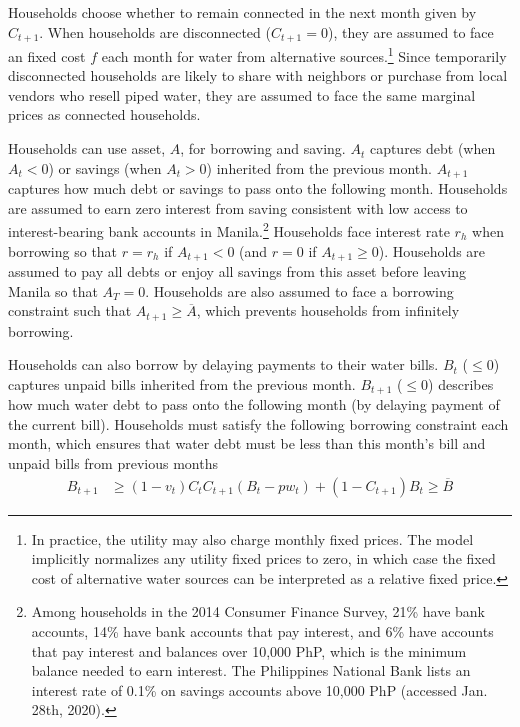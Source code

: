 \documentclass[12pt,table]{article}
\begin{document}
Households choose whether to remain connected in the next month given by $C_{t+1}$.  When households are disconnected ($C_{t+1}=0$), they are assumed to face an fixed cost $f$ each month for water from alternative sources.\footnote{In practice, the utility may also charge monthly fixed prices.  The model implicitly normalizes any utility fixed prices to zero, in which case the fixed cost of alternative water sources can be interpreted as a relative fixed price.}  Since temporarily disconnected households are likely to share with neighbors or purchase from local vendors who resell piped water, they are assumed to face the same marginal prices as connected households.

Households can use asset, $A$, for borrowing and saving.  $A_t$ captures debt (when $A_t<0$) or savings (when $A_t>0$) inherited from the previous month.  $A_{t+1}$ captures how much debt or savings to pass onto the following month.  Households are assumed to earn zero interest from saving consistent with low access to interest-bearing bank accounts in Manila.\footnote{Among households in the 2014 Consumer Finance Survey, 21\% have bank accounts, 14\% have bank accounts that pay interest, and 6\% have accounts that pay interest and balances over 10,000 PhP, which is the minimum balance needed to earn interest.  The Philippines National Bank lists an interest rate of 0.1\% on savings accounts above 10,000 PhP (accessed Jan. 28th, 2020).} Households face interest rate $r_h$ when borrowing so that  $r=r_h$ if $A_{t+1}<0$ (and $r = 0$ if $A_{t+1}\geq 0$).  Households are assumed to pay all debts or enjoy all savings from this asset before leaving Manila so that $A_{T}=0$.  Households are also assumed to face a borrowing constraint such that $A_{t+1}\geq\overline{A}$, which prevents households from infinitely borrowing.

Households can also borrow by delaying payments to their water bills.  $B_t$ ($\leq0$) captures unpaid bills inherited from the previous month.  $B_{t+1}$ ($\leq0$) describes how much water debt to pass onto the following month (by delaying payment of the current bill).  Households must satisfy the following borrowing constraint each month, which ensures that water debt must be less than this month's bill and unpaid bills from previous months
\begin{align}\label{eq:borrowingconstraint}
B_{t+1} &\geq (1-v_t)  C_{t} C_{t+1} (B_t -pw_t) + (1-C_{t+1})B_t  \geq \overline{B}
\end{align}
\end{document}
